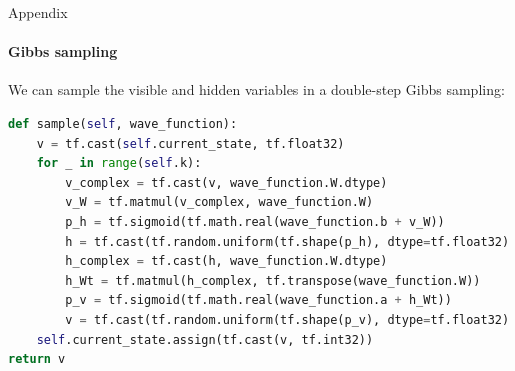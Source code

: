\documentclass{beamer}
\begin{document}
\begin{frame}[fragile]{Appendix}
\framesubtitle{Gibbs sampling}
We can sample the visible and hidden variables in a double-step Gibbs sampling:
\begin{lstlisting}[language=Python, style=kaolstplain]
def sample(self, wave_function):
	v = tf.cast(self.current_state, tf.float32)
	for _ in range(self.k):
		v_complex = tf.cast(v, wave_function.W.dtype)
		v_W = tf.matmul(v_complex, wave_function.W)
		p_h = tf.sigmoid(tf.math.real(wave_function.b + v_W))
		h = tf.cast(tf.random.uniform(tf.shape(p_h), dtype=tf.float32) < p_h, tf.float32)
		h_complex = tf.cast(h, wave_function.W.dtype)
		h_Wt = tf.matmul(h_complex, tf.transpose(wave_function.W))
		p_v = tf.sigmoid(tf.math.real(wave_function.a + h_Wt))
		v = tf.cast(tf.random.uniform(tf.shape(p_v), dtype=tf.float32) < p_v, tf.float32)
	self.current_state.assign(tf.cast(v, tf.int32))
return v
\end{lstlisting}
\end{frame}
\end{document}
